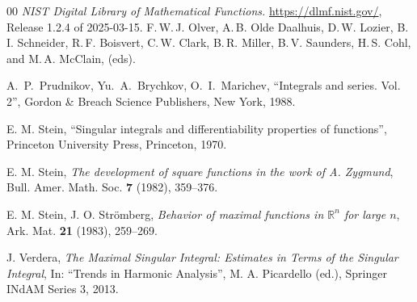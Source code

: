 \documentclass[a4paper,12pt,reqno]{amsart}
\numberwithin{equation}{section}
\theoremstyle{definition}
\newcommand{\R}{\mathbb{R}}
\begin{document}
\begin{thebibliography}{00}
\emph{NIST Digital Library of Mathematical Functions.} \url{https://dlmf.nist.gov/}, Release 1.2.4 of 2025-03-15. F.\,W.\,J. Olver, A.\,B. Olde Daalhuis, D.\,W. Lozier, B.\,I. Schneider, R.\,F. Boisvert, C.\,W. Clark, B.\,R. Miller, B.\,V. Saunders, H.\,S. Cohl, and M.\,A. McClain, (eds).



A.\ P.\ Prudnikov, Yu.\ A.\ Brychkov, O.\ I.\ Marichev, 
``Integrals and series. Vol. 2'',
Gordon \& Breach Science Publishers, New York, 1988.



E. M. Stein,
``Singular integrals and differentiability properties of functions'',
Princeton University Press, Princeton, 1970.




E. M. Stein,
\emph{The development of square functions in the work of A. Zygmund},
Bull. Amer. Math. Soc. {\bf 7} (1982), 359--376.


E. M. Stein, J. O. Str\"omberg,
\emph{Behavior of maximal functions in $\mathbb{R}^n$ for large $n$}, 
Ark. Mat. {\bf 21} (1983), 259--269.


J. Verdera, 
\emph{The Maximal Singular Integral: Estimates in Terms of the Singular Integral}, 
In: ``Trends in Harmonic Analysis'', M. A. Picardello (ed.), Springer INdAM Series 3, 2013.

\end{thebibliography}

%
%
\end{document}
